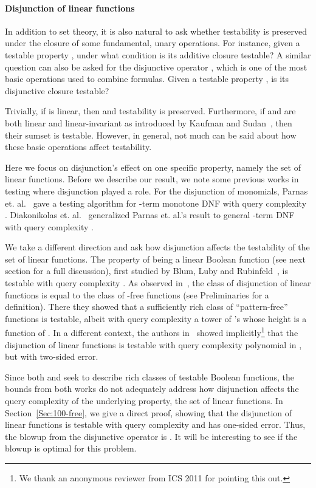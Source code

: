 \documentclass[11pt,english]{article}
\theoremstyle{definition}
\theoremstyle{remark}
\begin{document}
\paragraph{Disjunction of linear functions}
In addition to set theory, it is also natural to ask whether testability 
is preserved under the closure of some fundamental, unary operations. 
For instance, given a testable property , 
under what condition is its additive closure  testable? 
A similar question can also be asked 
for the disjunctive operator , 
which is one of the most basic operations used to combine formulas. 
Given a testable property , is its disjunctive closure  testable? 

Trivially, if  is linear, then  and testability is preserved.
Furthermore, if  and  are both linear 
and linear-invariant as introduced by Kaufman and Sudan~\cite{KS08}, 
then their sumset  is testable. 
However, in general, not much can be said 
about how these basic operations affect testability.

Here we focus on disjunction's effect on one specific property, namely the set of linear functions. 
Before we describe our result, we note some previous works in testing where disjunction played a role. 
For the disjunction of monomials,
Parnas et. al.~\cite{PRS03} gave a testing algorithm for -term monotone DNF with
query complexity . 
Diakonikolas et. al.~\cite{DLM+07} generalized Parnas et. al.'s result
to general -term DNF with query complexity .  

We take a different direction and ask how disjunction affects 
the testability of the set of linear functions.
The property of being a linear Boolean function (see next section for a full discussion), 
first studied by Blum, Luby and Rubinfeld~\cite{BLR93}, 
is testable with query complexity .
As observed in~\cite{BCSX09}, 
the class of disjunction of linear functions 
is equal to the class of -free functions (see Preliminaries for a definition). 
There they showed that a sufficiently rich class of ``pattern-free'' functions 
is testable, albeit with query complexity a tower of 's whose height is a function of .
In a different context, the authors in~\cite{GOSSW} showed implicitly\footnote{We thank an anonymous reviewer from ICS 2011 for pointing this out.}
that the disjunction of linear functions 
is testable with query complexity polynomial in , but with two-sided error.

Since both \cite{BCSX09} and \cite{GOSSW} seek to describe rich classes of testable Boolean functions, 
the bounds from both works do not adequately address how disjunction 
affects the query complexity of the underlying property, the set of linear functions. 
In Section~\ref{Sec:100-free}, we give a direct proof, 
showing that the disjunction of linear functions is testable 
with query complexity  and has one-sided error. 
Thus, the blowup from the disjunctive operator is . 
It will be interesting to see if the blowup is optimal for this problem.
\end{document}
